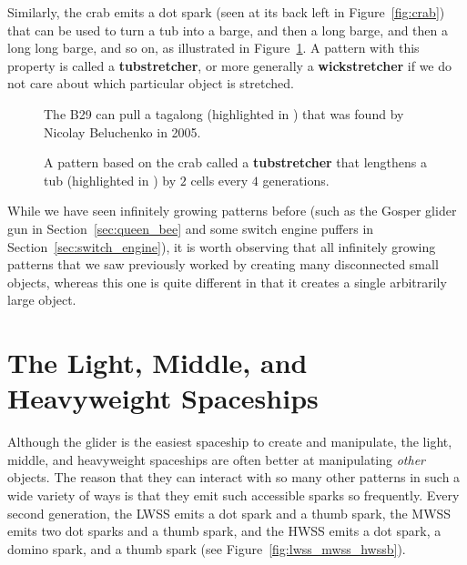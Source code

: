 Similarly, the crab emits a dot spark (seen at its back left in Figure~\ref{fig:crab}) that can be used to turn a tub into a barge, and then a long barge, and then a long long barge, and so on, as illustrated in Figure~\ref{fig:tubstretcher}. A pattern with this property is called a \textbf{tubstretcher}, or more generally a \textbf{wickstretcher} if we do not care about which particular object is stretched.

\begin{figure}[!htb]
	\centering
	\begin{minipage}[b]{.37\textwidth}
		\centering
		\caption{The B29 can pull a tagalong (highlighted in ) that was found by Nicolay Beluchenko in 2005.}\label{fig:b29_tagalong}
	\end{minipage} \hfill %
	\begin{minipage}[b]{.59\textwidth}
		\centering
		\caption{A pattern based on the crab called a \textbf{tubstretcher} that lengthens a tub (highlighted in ) by $2$ cells every $4$ generations.}\label{fig:tubstretcher}
	\end{minipage}
\end{figure}

While we have seen infinitely growing patterns before (such as the Gosper glider gun in Section~\ref{sec:queen_bee} and some switch engine puffers in Section~\ref{sec:switch_engine}), it is worth observing that all infinitely growing patterns that we saw previously worked by creating many disconnected small objects, whereas this one is quite different in that it creates a single arbitrarily large object.



\section{The Light, Middle, and Heavyweight Spaceships}\label{sec:lwss_mwss_hwss}

Although the glider is the easiest spaceship to create and manipulate, the light, middle, and heavyweight spaceships are often better at manipulating \emph{other} objects. The reason that they can interact with so many other patterns in such a wide variety of ways is that they emit such accessible sparks so frequently. Every second generation, the LWSS emits a dot spark and a thumb spark, the MWSS emits two dot sparks and a thumb spark, and the HWSS emits a dot spark, a domino spark, and a thumb spark (see Figure~\ref{fig:lwss_mwss_hwssb}).


